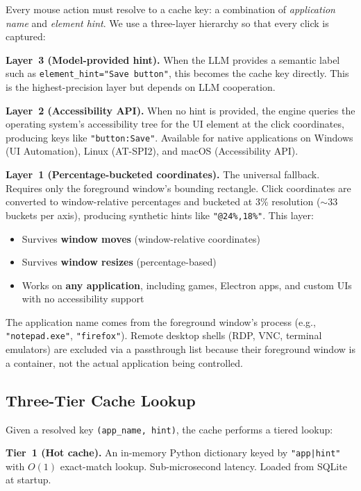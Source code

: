 \documentclass[conference]{IEEEtran}
\begin{document}
Every mouse action must resolve to a cache key: a combination of \emph{application name} and \emph{element hint}. We use a three-layer hierarchy so that every click is captured:

\textbf{Layer~3 (Model-provided hint).} When the LLM provides a semantic label such as \texttt{element\_hint="Save button"}, this becomes the cache key directly. This is the highest-precision layer but depends on LLM cooperation.

\textbf{Layer~2 (Accessibility API).} When no hint is provided, the engine queries the operating system's accessibility tree for the UI element at the click coordinates, producing keys like \texttt{"button:Save"}. Available for native applications on Windows (UI Automation), Linux (AT-SPI2), and macOS (Accessibility API).

\textbf{Layer~1 (Percentage-bucketed coordinates).} The universal fallback. Requires only the foreground window's bounding rectangle. Click coordinates are converted to window-relative percentages and bucketed at 3\% resolution (${\sim}33$ buckets per axis), producing synthetic hints like \texttt{"@24\%,18\%"}. This layer:

\begin{itemize}[noitemsep,topsep=0pt]
    \item Survives \textbf{window moves} (window-relative coordinates)
    \item Survives \textbf{window resizes} (percentage-based)
    \item Works on \textbf{any application}, including games, Electron apps, and custom UIs with no accessibility support
\end{itemize}

The application name comes from the foreground window's process (e.g., \texttt{"notepad.exe"}, \texttt{"firefox"}). Remote desktop shells (RDP, VNC, terminal emulators) are excluded via a passthrough list because their foreground window is a container, not the actual application being controlled.

\subsection{Three-Tier Cache Lookup}

Given a resolved key \texttt{(app\_name, hint)}, the cache performs a tiered lookup:

\textbf{Tier~1 (Hot cache).} An in-memory Python dictionary keyed by \texttt{"app|hint"} with $O(1)$ exact-match lookup. Sub-microsecond latency. Loaded from SQLite at startup.
\end{document}
